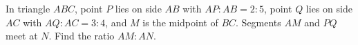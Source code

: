 In triangle $ABC$, point $P$ lies on side $AB$ with $AP:AB=2:5$, point $Q$ lies on side $AC$ with $AQ:AC=3:4$, and $M$ is the midpoint of $BC$. Segments $AM$ and $PQ$ meet at $N$. Find the ratio $AM:AN$.
